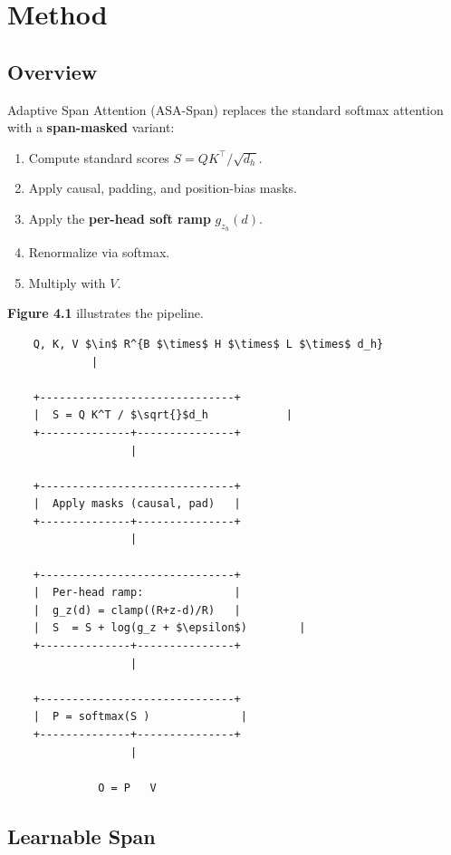 
\section{Method}

\subsection{Overview}

Adaptive Span Attention (ASA-Span) replaces the standard softmax attention 
with a \textbf{span-masked} variant:

\begin{enumerate}
\item Compute standard scores $S = QK^\top / \sqrt{d_h}$.
\item Apply causal, padding, and position-bias masks.
\item Apply the \textbf{per-head soft ramp} $g_{z_h}(d)$.
\item Renormalize via softmax.
\item Multiply with $V$.

\end{enumerate}
\textbf{Figure 4.1} illustrates the pipeline.

\begin{lstlisting}
    Q, K, V $\in$ R^{B $\times$ H $\times$ L $\times$ d_h}
             |
              
    +------------------------------+
    |  S = Q K^T / $\sqrt{}$d_h            |
    +--------------+---------------+
                   |
                    
    +------------------------------+
    |  Apply masks (causal, pad)   |
    +--------------+---------------+
                   |
                    
    +------------------------------+
    |  Per-head ramp:              |
    |  g_z(d) = clamp((R+z-d)/R)   |
    |  S  = S + log(g_z + $\epsilon$)        |
    +--------------+---------------+
                   |
                    
    +------------------------------+
    |  P = softmax(S )              |
    +--------------+---------------+
                   |
                    
              O = P   V
\end{lstlisting}

\subsection{Learnable Span}

